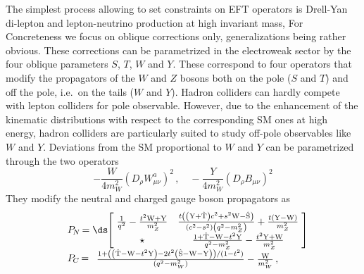 The simplest process allowing to set constraints on EFT operators is Drell-Yan di-lepton and lepton-neutrino production at high invariant mass, For Concreteness we focus on oblique corrections only, generalizations being rather obvious. These corrections can be parametrized in the electroweak sector by the four oblique parameters $S$, $T$, $W$ and $Y$. These correspond to four operators that modify the propagators of the $W$ and $Z$ bosons both on the pole ($S$ and $T$) and off the pole, i.e.~on the tails ($W$ and $Y$). Hadron colliders can hardly compete with lepton colliders for pole observable. However, due to the enhancement of the kinematic distributions with respect to the corresponding SM ones at high energy, hadron colliders are particularly suited to study off-pole observables like $W$ and $Y$. Deviations from the SM proportional to $W$ and $Y$ can be parametrized through the two operators
\begin{equation}
 -\frac{W}{4m_W^2}(D_\rho W_{\mu\nu}^a)^2   \,, \quad  -\frac{Y}{4m_W^2}(D_\rho B_{\mu\nu})^2   
 \end{equation}
They modify the neutral and charged gauge boson propagators as
\begin{equation}\label{eq:propagators}
\begin{array}{ll}
& P_{\hspace{-1pt}{N}}\hspace{-1pt} = \ds\hspace{-2.5pt}\left[\hspace{-2pt}
\begin{array}{cc}
 \frac{1}{q^2}-\frac{t^{2}{\rm{\sc{W}}}+{\rm{\sc{Y}}}}{m_Z^2} & \frac{t \left(\left({\rm{\sc{Y}}}+{\rm\hat{T}}\right) c^2+s^2 {\rm{\sc{W}}}-{\rm\hat{S}}\right)}{\left(c^2-s^2\right) \left(q^2-m_Z^2\right)}+\frac{t ({\rm{\sc{Y}}}-{\rm{\sc{W}}})}{m_Z^2} \\
 \star & \frac{1+ {\rm\hat{T}}-{\rm{\sc{W}}}-t^{2}{\rm{\sc{Y}}}}{q^2-m_Z^2}-\frac{t^{2}{\rm{\sc{Y}}}+{\rm{\sc{W}}}}{m_Z^2} \\
\end{array}
\hspace{-2pt}
\right] \\
& P_{\hspace{-1pt}{C}}\hspace{-1pt} =
\begin{array}{c}
\frac{1+\left( \left({\rm\hat{T}}-{\rm{\sc{W}}}-t^2 {\rm{\sc{Y}}}\right)-2 t^2 \left({\rm\hat{S}}-{\rm{\sc{W}}}-{\rm{\sc{Y}}}\right)\right)/(1-t^2)}{(q^{2}-m_W^2)}-\frac{{\rm{\sc{W}}}}{m_W^2}\,,
\end{array}
\end{array}
\end{equation}
